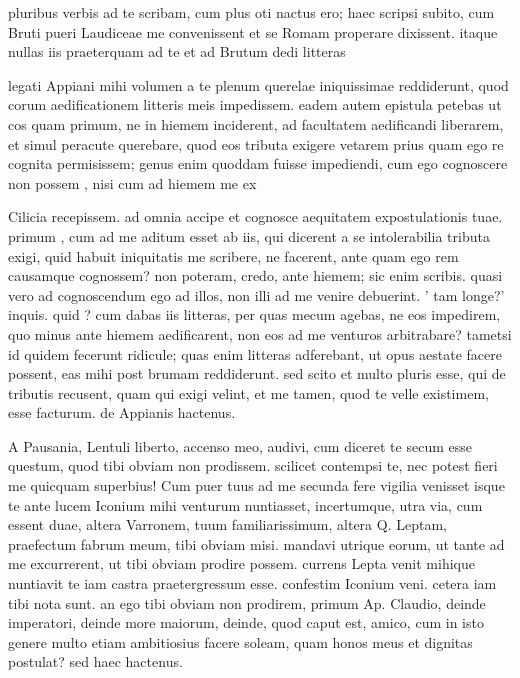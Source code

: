 


 pluribus verbis ad te scribam, cum plus oti nactus ero; haec scripsi subito, cum Bruti pueri Laudiceae me convenissent et se Romam properare dixissent. itaque nullas iis praeterquam ad te et ad Brutum dedi litteras

 legati Appiani mihi volumen a te plenum querelae iniquissimae reddiderunt, quod corum aedificationem litteris meis impedissem. eadem autem epistula petebas ut cos quam primum, ne in hiemem inciderent, ad facultatem aedificandi liberarem, et simul peracute querebare, quod eos tributa exigere vetarem prius quam ego re cognita permisissem; genus enim quoddam fuisse impediendi, cum ego cognoscere non possem , nisi cum ad hiemem me ex

 Cilicia recepissem. ad omnia accipe et cognosce aequitatem expostulationis tuae. primum , cum ad me aditum esset ab iis, qui dicerent a se intolerabilia tributa exigi, quid habuit iniquitatis me scribere, ne facerent, ante quam ego rem causamque cognossem? non poteram, credo, ante hiemem; sic enim scribis. quasi vero ad cognoscendum ego ad illos, non illi ad me venire debuerint. ' tam longe?' inquis. quid ? cum dabas iis litteras, per quas mecum agebas, ne eos impedirem, quo minus ante hiemem aedificarent, non eos ad me venturos arbitrabare? tametsi id quidem fecerunt ridicule; quas enim litteras adferebant, ut opus aestate facere possent, eas mihi post brumam reddiderunt. sed scito et multo pluris esse, qui de tributis recusent, quam qui exigi velint, et me tamen, quod te velle existimem, esse facturum. de Appianis hactenus.

 A Pausania, Lentuli liberto, accenso meo, audivi, cum diceret te secum esse questum, quod tibi obviam non prodissem. scilicet contempsi te, nec potest fieri me quicquam superbius! Cum puer tuus ad me secunda fere vigilia venisset isque te ante lucem Iconium mihi venturum nuntiasset, incertumque, utra via, cum essent duae, altera Varronem, tuum familiarissimum, altera Q. Leptam, praefectum fabrum meum, tibi obviam misi. mandavi utrique eorum, ut tante ad me excurrerent, ut tibi obviam prodire possem. currens Lepta venit mihique nuntiavit te iam castra praetergressum esse. confestim Iconium veni. cetera iam tibi nota sunt. an ego tibi obviam non prodirem, primum Ap. Claudio, deinde imperatori, deinde more maiorum, deinde, quod caput est, amico, cum in isto genere multo etiam ambitiosius facere soleam, quam honos meus et dignitas postulat? sed haec hactenus.

